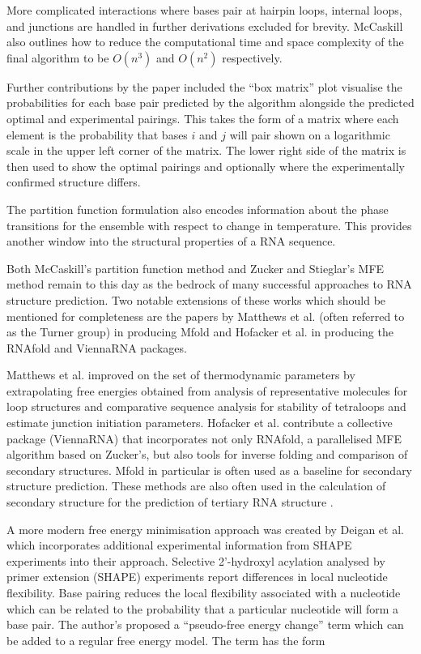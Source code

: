 \documentclass[journal]{IEEEtran}
\begin{document}
More complicated interactions where bases pair at hairpin loops, internal loops, and junctions are handled in further derivations excluded for brevity. McCaskill also outlines how to reduce the computational time and space complexity of the final algorithm to be $O(n^3)$ and $O(n^2)$ respectively.

Further contributions by the paper included the ``box matrix'' plot visualise the probabilities for each base pair predicted by the algorithm alongside the predicted optimal and experimental pairings. This takes the form of a matrix where each element is the probability that bases $i$ and $j$ will pair shown on a logarithmic scale in the upper left corner of the matrix. The lower right side of the matrix is then used to show the optimal pairings and optionally where the experimentally confirmed structure differs. 

The partition function formulation also encodes information about the phase transitions for the ensemble with respect to change in temperature. This provides another window into the structural properties of a RNA sequence.

Both McCaskill's partition function method and Zucker and Stieglar's MFE method remain to this day as the bedrock of many successful approaches to RNA structure prediction. Two notable extensions of these works which should be mentioned for completeness are the papers by Matthews et al. \cite{mathews1999expanded} (often referred to as the Turner group) in producing Mfold and Hofacker et al. \cite{hofacker1994fast} in producing the RNAfold and ViennaRNA packages. 

Matthews et al. improved on the set of thermodynamic parameters by extrapolating free energies obtained from analysis of representative molecules for loop structures and comparative sequence analysis for stability of tetraloops and estimate junction initiation parameters. Hofacker et al. contribute a collective package (ViennaRNA) that incorporates not only RNAfold, a parallelised MFE algorithm based on Zucker's, but also tools for inverse folding and comparison of secondary structures. Mfold in particular is often used as a baseline for secondary structure prediction. These methods are also often used in the calculation of secondary structure for the prediction of tertiary RNA structure \cite{laing2010computational, cruz2012rna, miao2015rna}.

A more modern free energy minimisation approach was created by Deigan et al. \cite{deigan2009accurate} which incorporates additional experimental information from SHAPE experiments into their approach. Selective 2'-hydroxyl acylation analysed by primer extension (SHAPE) experiments report differences in local nucleotide flexibility. Base pairing reduces the local flexibility associated with a nucleotide which can be related to the probability that a particular nucleotide will form a base pair. The author's proposed a ``pseudo-free energy change'' term which can be added to a regular free energy model. The term has the form
\end{document}
